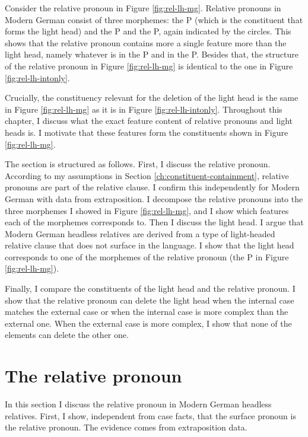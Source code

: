 Consider the relative pronoun in Figure \ref{fig:rel-lh-mg}.
Relative pronouns in Modern German consist of three morphemes: the P (which is the constituent that forms the light head) and the P and the P, again indicated by the circles. This shows that the relative pronoun contains more a single feature more than the light head, namely whatever is in the P and in the P. Besides that, the structure of the relative pronoun in Figure \ref{fig:rel-lh-mg} is identical to the one in Figure \ref{fig:rel-lh-intonly}.

Crucially, the constituency relevant for the deletion of the light head is the same in Figure \ref{fig:rel-lh-mg} as it is in Figure \ref{fig:rel-lh-intonly}. Throughout this chapter, I discuss what the exact feature content of relative pronouns and light heads is. I motivate that these features form the constituents shown in Figure \ref{fig:rel-lh-mg}.

The section is structured as follows.
First, I discuss the relative pronoun. According to my assumptions in Section \ref{ch:constituent-containment}, relative pronouns are part of the relative clause. I confirm this independently for Modern German with data from extraposition. I decompose the relative pronouns into the three morphemes I showed in Figure \ref{fig:rel-lh-mg}, and I show which features each of the morphemes corresponds to.
Then I discuss the light head. I argue that Modern German headless relatives are derived from a type of light-headed relative clause that does not surface in the language. I show that the light head corresponds to one of the morphemes of the relative pronoun (the P in Figure \ref{fig:rel-lh-mg}).

Finally, I compare the constituents of the light head and the relative pronoun. I show that the relative pronoun can delete the light head when the internal case matches the external case or when the internal case is more complex than the external one. When the external case is more complex, I show that none of the elements can delete the other one.


\section{The relative pronoun}\label{sec:mg-rel}

In this section I discuss the relative pronoun in Modern German headless relatives.
First, I show, independent from case facts, that the surface pronoun is the relative pronoun. The evidence comes from extraposition data.

